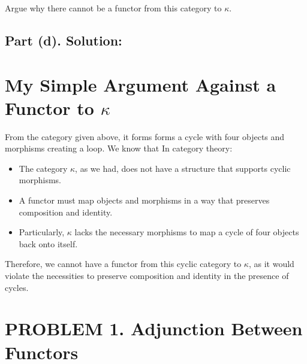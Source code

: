 \documentclass{article}
\begin{document}
Argue why there cannot be a functor from this category to $\kappa$.

\subsection*{Part (d). Solution:}


\section*{My Simple Argument Against a Functor to \(\kappa\)}

From the category given above, it forms forms a cycle with four objects and morphisms creating a loop. 
We know that In category theory:

\begin{itemize}    
    \item The category \(\kappa\), as we had, does not have a structure that supports cyclic morphisms.
    \item A functor must map objects and morphisms in a way that preserves composition and identity.
    \item Particularly, \(\kappa\) lacks the necessary morphisms to map a cycle of four objects back onto itself.
\end{itemize}

Therefore, we cannot have a functor from this cyclic category to \(\kappa\), 
as it would violate the necessities to preserve composition and identity in the presence of cycles.



\newpage

\section*{PROBLEM 1. Adjunction Between Functors  }
\end{document}
